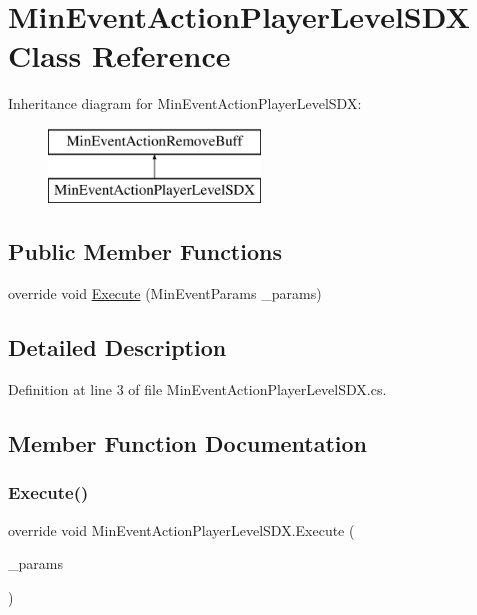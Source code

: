 \hypertarget{class_min_event_action_player_level_s_d_x}{}\section{Min\+Event\+Action\+Player\+Level\+S\+DX Class Reference}
\label{class_min_event_action_player_level_s_d_x}
Inheritance diagram for Min\+Event\+Action\+Player\+Level\+S\+DX\+:\begin{figure}[H]
\begin{center}
\leavevmode
\includegraphics[height=2.000000cm]{de/db3/class_min_event_action_player_level_s_d_x}
\end{center}
\end{figure}
\subsection*{Public Member Functions}
\begin{DoxyCompactItemize}
\item 
override void \mbox{\hyperlink{class_min_event_action_player_level_s_d_x_a98c7e07867d95d6d59319a137d07d6a0}{Execute}} (Min\+Event\+Params \+\_\+params)
\end{DoxyCompactItemize}


\subsection{Detailed Description}


Definition at line 3 of file Min\+Event\+Action\+Player\+Level\+S\+D\+X.\+cs.



\subsection{Member Function Documentation}
\mbox{\label{class_min_event_action_player_level_s_d_x_a98c7e07867d95d6d59319a137d07d6a0}} 
\subsubsection{\texorpdfstring{Execute()}{Execute()}}
{\footnotesize\ttfamily override void Min\+Event\+Action\+Player\+Level\+S\+D\+X.\+Execute (\begin{DoxyParamCaption}\item[{Min\+Event\+Params}]{\+\_\+params }\end{DoxyParamCaption})}



